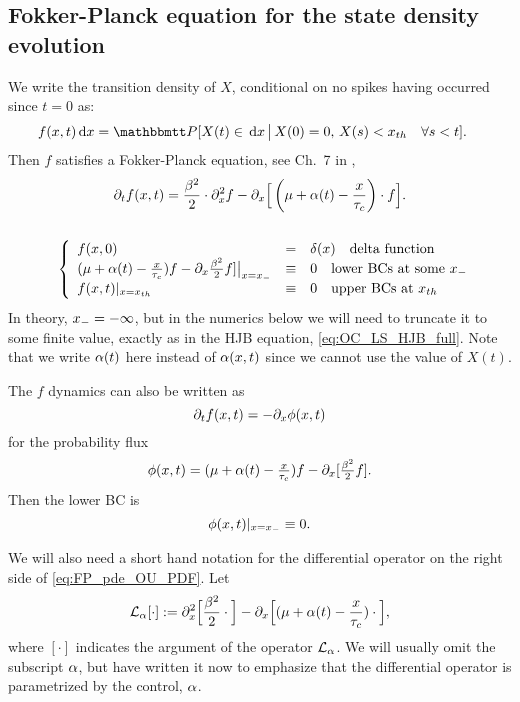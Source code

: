 \subsection{Fokker-Planck equation for the state density evolution}
We write the transition density of $X$, conditional on no
spikes having occurred since $t=0$ as:
\begin{align*}
f(x,t) \intd{x} &= \Prob[X(t)\in \intd{x} \,\big|\, X(0) = 0,\, X(s) < \xth
\quad \forall s < t].
\end{align*}
Then $f$ satisfies a Fokker-Planck equation, see Ch.\ 7 in \cite{Jacobs},
\begin{equation}  
\begin{gathered}
{\partial}_t f(x,t) =
				\frac{\beta^2 }{2}\cdot {\partial}^2_x f -
				{\partial}_x \Big[ \left( {\mu } + \alpha(t)- \frac{x}{\tau_c}\right)  \cdot f \Big].
\\
\\
\begin{array}{ll}
	& 
	\left\{ \begin{array}{lcl}
	 f(x,0) &=& \delta(x) \quad \textrm{delta function}
	\\
	({\mu } + \alpha(t)- \tfrac x {\tau_c})f - {\partial}_x \tfrac {\beta^2}2 f] \big|_{x={ x_{-} }} &\equiv&
	0 \quad \textrm{lower BCs at some } { x_{-} }
	\\
	f(x,t) |_{x={ x_{th} }} &\equiv& 0 \quad \textrm{upper BCs at } { x_{th} }
\end{array} \right.
\end{array}
\label{eq:FP_pde_OU_PDF}
\end{gathered}
\end{equation}
In theory, ${ x_{-} } = -\infty$, but in the numerics below we will need to
truncate it to some finite value, exactly as in the HJB equation,
\cref{eq:OC_LS_HJB_full}.
Note that we write $\alpha(t)$ here instead of $\alpha(x,t)$ since we cannot use the
value of $X(t)$.

The $f$ dynamics can also be written as
$$
{\partial}_t f(x,t) = - {\partial}_x \phi(x,t)
$$
for the probability flux
$$
\phi(x,t) = ({\mu } + \alpha(t) - \tfrac x {\tau_c})f - {\partial}_x [\tfrac {\beta^2}2 f].
$$
Then the lower BC is
$$
\phi(x,t) |_{x={ x_{-} }} \equiv 0.
$$

We will also need a short hand notation for the differential operator on the
right side of \cref{eq:FP_pde_OU_PDF}. Let
$$ { \mathcal{L} }_\alpha[\cdot] := {\partial}^2_x \Big[\frac{\beta^2 }{2} \cdot\Big] -
 {\partial}_x \Big[ ({\mu } + \alpha(t)- \frac{x}{\tau_c}) \cdot \Big],$$
 where
 $[\cdot]$ indicates the argument of the operator ${ \mathcal{L} }_\alpha$. We will usually
 omit the subscript $\alpha$, but have written it now to emphasize that the
 differential operator is parametrized by the control, $\alpha$.

